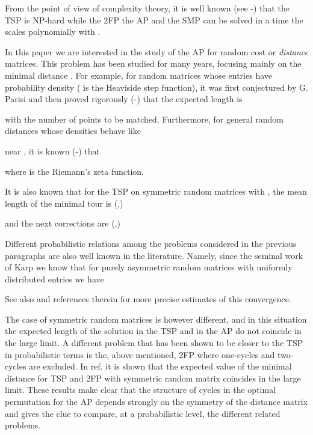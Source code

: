\documentclass[]{iopart}
\begin{document}
{}From the point of view of complexity theory,
it is well known (see \cite{Papa}-\cite{LP}) that the TSP is  NP-hard 
while the 2FP  the AP  and the SMP 
can be solved in a time the scales polynomially with .

In this paper we are interested in the study of the AP for random cost or
{\it distance} matrices.  
 This problem
 has been studied for many years,
 focusing mainly on the minimal 
 distance .
 For example, for random matrices whose entries have probability density 
  ( is the 
Heaviside step function), it was first conjectured by G. Parisi
 \cite{P1} and then proved rigorously (\cite{prueb1}-\cite{prueb3}) that
the expected length is 

 with   the number of points to be matched. Furthermore,
 for general random distances whose densities  behave like  
 
near , 
it is known (\cite{P21}-\cite{P4}) that

where  is the Riemann's zeta function. 

It is also 
known that  for the TSP on symmetric random matrices with ,
 the mean length of the minimal tour is (\cite{atp1},\cite{P5}) 
 
and the next  corrections are (\cite{atp2},\cite{atp3})


Different probabilistic relations 
among the problems considered in the previous paragraphs
are also well known in the literature. Namely, since the seminal work of Karp
\cite{Karp} we know that for purely asymmetric random matrices
with uniformly distributed entries we have

See also \cite{Frieze} and references therein for more precise
estimates of this convergence.

The case of symmetric random matrices is however different, and in this 
situation the expected length of the solution in the TSP and in the 
AP do not coincide in the large  limit. 
A different problem that has been shown to 
be closer to the TSP in probabilistic terms is 
the, above mentioned, 2FP where one-cycles 
and two-cycles are excluded. 
In ref. \cite{Frieze1} it is shown that the expected value 
of the minimal distance for TSP and 2FP with symmetric random matrix
coincides in the large  limit.
These results make clear that the structure of cycles in the optimal 
permutation for the AP depends strongly on the symmetry of 
the distance matrix and 
gives the clue to compare, at a probabilistic level, the different 
related problems.
\end{document}
